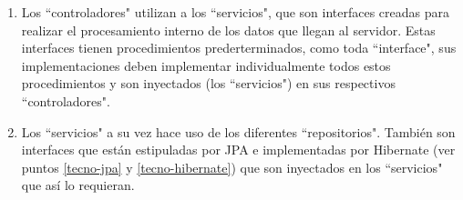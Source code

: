     \begin{enumerate}
        \item Los ``controladores" utilizan a los ``servicios", que son interfaces creadas para realizar el procesamiento interno de los datos que llegan al servidor. Estas interfaces tienen procedimientos prederterminados, como toda ``interface", sus implementaciones deben implementar individualmente todos estos procedimientos y son inyectados (los ``servicios") en sus respectivos ``controladores".
        
        \item Los ``servicios" a su vez hace uso de los diferentes ``repositorios". También son interfaces que están estipuladas por JPA e implementadas por Hibernate (ver puntos \ref{tecno-jpa} y \ref{tecno-hibernate}) que son inyectados en los ``servicios" que así lo requieran.
    \end{enumerate}
    
\pagebreak